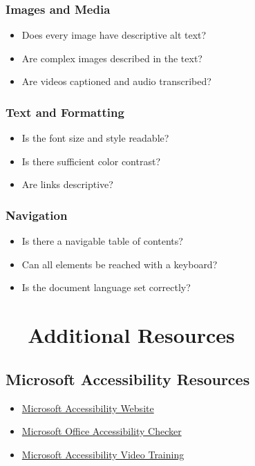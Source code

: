 \subsubsection{Images and Media}\label{ch15:sssec:checklist-images}
\begin{itemize}
	\item Does every image have descriptive alt text?
	\item Are complex images described in the text?
	\item Are videos captioned and audio transcribed?
\end{itemize}

\subsubsection{Text and Formatting}\label{ch15:sssec:checklist-text}
\begin{itemize}
	\item Is the font size and style readable?
	\item Is there sufficient color contrast?
	\item Are links descriptive?
\end{itemize}

\subsubsection{Navigation}\label{ch15:sssec:checklist-nav}
\begin{itemize}
	\item Is there a navigable table of contents?
	\item Can all elements be reached with a keyboard?
	\item Is the document language set correctly?
\end{itemize}

\section{~~Additional Resources}\label{ch15:sec:additional-resources}

\subsection{Microsoft Accessibility Resources}\label{ch15:ssec:ms-resources}
\begin{itemize}
	\item \href{https://www.microsoft.com/en-us/accessibility}{Microsoft Accessibility Website}
	\item \href{https://support.microsoft.com/en-us/office/make-your-content-accessible-to-everyone-with-the-accessibility-checker-38059c2d-45ef-4830-9797-618f0e96f3ab}{Microsoft Office Accessibility Checker}
	\item \href{https://support.microsoft.com/en-us/topic/accessibility-video-training-71572a1d-5659-4200-81c6-76dc3b4b82fe}{Microsoft Accessibility Video Training}
\end{itemize}

